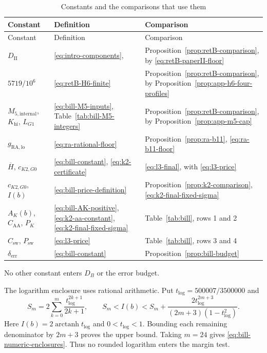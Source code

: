 \begin{longtable}{@{}p{.27\linewidth}p{.31\linewidth}p{.34\linewidth}@{}}
\caption{Constants and the comparisons that use them}
\label{tab:bill-binding}\\
\hline
Constant & Definition & Comparison\\
\hline
\endfirsthead
\hline
Constant & Definition & Comparison\\
\hline
\endhead
$D_{\mathrm{II}}$ & \eqref{eq:intro-components}, \cite[(6.3a)]{PaperII}
 & Proposition~\ref{prop:retB-comparison}, by \eqref{eq:retB-paperII-floor}\\
$5719/10^6$ & \eqref{eq:retB-H6-finite}
 & Proposition~\ref{prop:retB-comparison}, by
   Proposition~\ref{prop:app-h6-four-profiles}\\
$M_{5,\mathrm{internal}}$, $K_{\mathrm{hi}}$, $L_{G1}$
 & \eqref{eq:bill-M5-inputs}, Table~\ref{tab:bill-M5-integers}
 & Proposition~\ref{prop:retB-comparison}, by
   Proposition~\ref{prop:app-m5-cap}\\
$g_{\mathrm{RA,lo}}$ & \eqref{eq:ra-rational-floor}
 & Proposition~\ref{prop:ra-b11}, \eqref{eq:ra-b11-floor}\\
$\overline H$, $c_{K2,G0}$ & \eqref{eq:bill-constant}, \eqref{eq:k2-certificate}
 & \eqref{eq:l3-final}, with \eqref{eq:l3-price}\\
$c_{K2,G0}$, $I(b)$ & \eqref{eq:bill-price-definition}
 & Proposition~\ref{prop:k2-comparison}, \eqref{eq:k2-final-fixed-sigma}\\
$A_K(b)$, $C_{\mathrm{AA}}$, $P_K$
 & \eqref{eq:bill-AK-positive}, \eqref{eq:k2-aa-constant},
   \eqref{eq:k2-final-fixed-sigma}
 & Table~\ref{tab:bill}, rows 1 and 2\\
$C_{\mathrm{sw}}$, $P_{\mathrm{sw}}$ & \eqref{eq:l3-price}
 & Table~\ref{tab:bill}, rows 3 and 4\\
$\delta_{\mathrm{err}}$ & \eqref{eq:bill-constant}
 & Proposition~\ref{prop:bill-budget}\\
\hline
\end{longtable}
\endgroup
No other constant enters $D_B$ or the error budget.

The logarithm enclosure uses rational arithmetic.
Put $t_{\log}=500007/3500000$ and
\begin{equation}\label{eq:bill-log-enclosure}
 S_m=2\sum_{k=0}^{m}\frac{t_{\log}^{2k+1}}{2k+1},
 \qquad
 S_m< I(b)<S_m+
       \frac{2t_{\log}^{2m+3}}{(2m+3)(1-t_{\log}^2)}.
\end{equation}
Here $I(b)=2\operatorname{arctanh}t_{\log}$ and $0<t_{\log}<1$.
Bounding each remaining denominator by $2m+3$ proves the upper bound.
Taking $m=24$ gives \eqref{eq:bill-numeric-enclosures}.
Thus no rounded logarithm enters the margin test.

